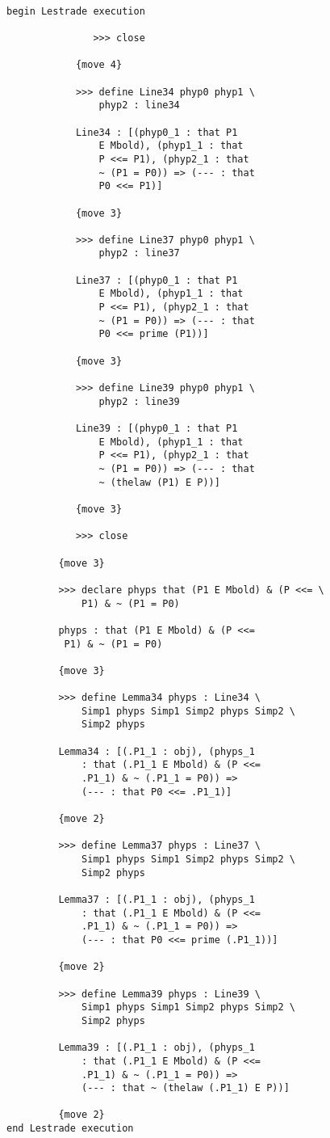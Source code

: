 \documentclass[12pt]{article}
\begin{document}
\begin{verbatim}

begin Lestrade execution

               >>> close

            {move 4}

            >>> define Line34 phyp0 phyp1 \
                phyp2 : line34

            Line34 : [(phyp0_1 : that P1 
                E Mbold), (phyp1_1 : that 
                P <<= P1), (phyp2_1 : that 
                ~ (P1 = P0)) => (--- : that 
                P0 <<= P1)]

            {move 3}

            >>> define Line37 phyp0 phyp1 \
                phyp2 : line37

            Line37 : [(phyp0_1 : that P1 
                E Mbold), (phyp1_1 : that 
                P <<= P1), (phyp2_1 : that 
                ~ (P1 = P0)) => (--- : that 
                P0 <<= prime (P1))]

            {move 3}

            >>> define Line39 phyp0 phyp1 \
                phyp2 : line39

            Line39 : [(phyp0_1 : that P1 
                E Mbold), (phyp1_1 : that 
                P <<= P1), (phyp2_1 : that 
                ~ (P1 = P0)) => (--- : that 
                ~ (thelaw (P1) E P))]

            {move 3}

            >>> close

         {move 3}

         >>> declare phyps that (P1 E Mbold) & (P <<= \
             P1) & ~ (P1 = P0)

         phyps : that (P1 E Mbold) & (P <<= 
          P1) & ~ (P1 = P0)

         {move 3}

         >>> define Lemma34 phyps : Line34 \
             Simp1 phyps Simp1 Simp2 phyps Simp2 \
             Simp2 phyps

         Lemma34 : [(.P1_1 : obj), (phyps_1 
             : that (.P1_1 E Mbold) & (P <<= 
             .P1_1) & ~ (.P1_1 = P0)) => 
             (--- : that P0 <<= .P1_1)]

         {move 2}

         >>> define Lemma37 phyps : Line37 \
             Simp1 phyps Simp1 Simp2 phyps Simp2 \
             Simp2 phyps

         Lemma37 : [(.P1_1 : obj), (phyps_1 
             : that (.P1_1 E Mbold) & (P <<= 
             .P1_1) & ~ (.P1_1 = P0)) => 
             (--- : that P0 <<= prime (.P1_1))]

         {move 2}

         >>> define Lemma39 phyps : Line39 \
             Simp1 phyps Simp1 Simp2 phyps Simp2 \
             Simp2 phyps

         Lemma39 : [(.P1_1 : obj), (phyps_1 
             : that (.P1_1 E Mbold) & (P <<= 
             .P1_1) & ~ (.P1_1 = P0)) => 
             (--- : that ~ (thelaw (.P1_1) E P))]

         {move 2}
end Lestrade execution
\end{verbatim}
\end{document}
